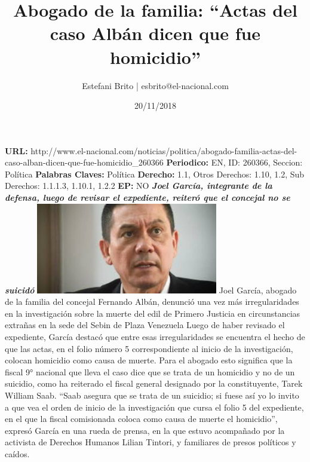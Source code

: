 \documentclass{article}%
\title{\textbf{Abogado de la familia: “Actas del caso Albán dicen que fue homicidio”}}%
\author{Estefani Brito | esbrito@el{-}nacional.com}%
\date{20/11/2018}%
\begin{document}
%
\normalsize%
\maketitle%
\textbf{URL: }%
http://www.el{-}nacional.com/noticias/politica/abogado{-}familia{-}actas{-}del{-}caso{-}alban{-}dicen{-}que{-}fue{-}homicidio\_260366\newline%
%
\textbf{Periodico: }%
EN, %
ID: %
260366, %
Seccion: %
Política\newline%
%
\textbf{Palabras Claves: }%
Política\newline%
%
\textbf{Derecho: }%
1.1, %
Otros Derechos: %
1.10, 1.2, %
Sub Derechos: %
1.1.1.3, 1.10.1, 1.2.2\newline%
%
\textbf{EP: }%
NO\newline%
\newline%
%
\textbf{\textit{Joel García, integrante de la defensa, luego de revisar el expediente, reiteró que el concejal no se suicidó}}%
\newline%
\newline%
%
\includegraphics[width=300px]{15.jpg}%
\newline%
%
Joel García, abogado de la familia del concejal Fernando Albán, denunció una vez más irregularidades en la investigación sobre la muerte del edil de Primero Justicia en circunstancias extrañas en la sede del Sebin de Plaza Venezuela%
\newline%
%
Luego de haber revisado el expediente, García destacó que entre esas irregularidades se encuentra el hecho de que las actas, en el folio número 5 correspondiente al inicio de la investigación, colocan homicidio como causa de muerte. Para el abogado esto significa que la fiscal 9° nacional que lleva el caso dice que se trata de un homicidio y no de un suicidio, como ha reiterado el fiscal general designado por la constituyente, Tarek William Saab.%
\newline%
%
“Saab asegura que se trata de un suicidio; si fuese así yo lo invito a que vea el orden de inicio de la investigación que cursa el folio 5 del expediente, en el que la fiscal comisionada coloca como causa de muerte el homicidio”, expresó García en una rueda de prensa, en la que estuvo acompañado por la activista de Derechos Humanos Lilian Tintori, y familiares de presos políticos y caídos.%
\end{document}
